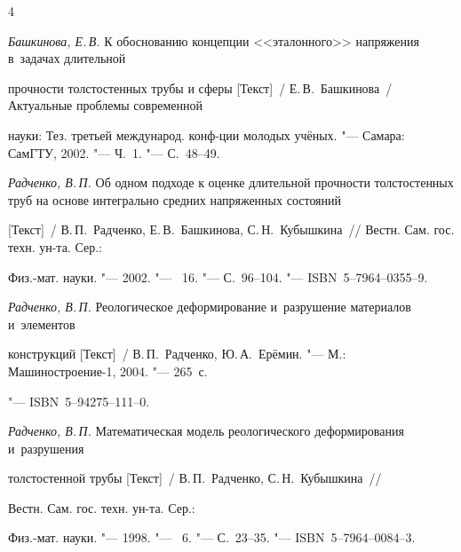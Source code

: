 \begin{thebibliography}{4}



\item \textit{Башкинова, Е.\,В.} К обоснованию концепции <<эталонного>> напряжения в~задачах длительной 

прочности толстостенных трубы и сферы [Текст]~/  Е.\,В.~Башкинова~/ Актуальные проблемы современной 

науки: Тез. третьей международ. конф-ции молодых учёных. "--- Самара: СамГТУ, 2002. "--- Ч.~1. "--- С.~48--49.



\item \textit{Радченко, В.\,П.} Об одном подходе к оценке длительной прочности толстостенных труб на основе интегрально средних напряженных состояний 

[Текст]~/  В.\,П.~Радченко, Е.\,В.~Башкинова, С.\,Н.~Кубышкина~/\!/ Вестн. Сам. гос. техн. ун-та. Сер.: 

Физ.-мат. науки. "--- 2002. "--- \No~16. "--- С.~96--104. "--- ISBN~5--7964--0355--9.



\item \textit{Радченко, В.\,П.} Реологическое деформирование и~разрушение материалов и~элементов 

конструкций [Текст]~/ В.\,П.~Радченко, Ю.\,А.~Ерёмин. "--- М.: Машиностроение-1, 2004. "--- 265~с.

"--- ISBN~5--94275--111--0.



\item \textit{Радченко, В.\,П.} Математическая модель реологического деформирования и~разрушения 

толстостенной трубы [Текст]~/  В.\,П.~Радченко, С.\,Н.~Кубышкина~/\!/ 

Вестн. Сам. гос. техн. ун-та. Сер.: 

Физ.-мат. науки. "--- 1998. "--- \No~6. "--- С.~23--35. "--- ISBN~5--7964--0084--3.





\end{thebibliography}



\vspace{8mm}



\makeengtitle













%

